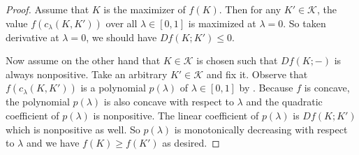 \begin{proof}
Assume that \(K\) is the maximizer of \(f(K)\). Then for any \(K' \in \mathcal{K}\), the value \(f(c_\lambda(K, K'))\) over all \(\lambda \in [0, 1]\) is maximized at \(\lambda = 0\). So taken derivative at \(\lambda = 0\), we should have \(Df(K; K') \leq 0\).

Now assume on the other hand that \(K \in \mathcal{K}\) is chosen such that \(Df(K; -)\) is always nonpositive. Take an arbitrary \(K' \in \mathcal{K}\) and fix it. Observe that \(f(c_\lambda(K, K'))\) is a polynomial \(p(\lambda)\) of \(\lambda \in [0, 1]\) by . Because \(f\) is concave, the polynomial \(p(\lambda)\) is also concave with respect to \(\lambda\) and the quadratic coefficient of \(p(\lambda)\) is nonpositive. The linear coefficient of \(p(\lambda)\) is \(Df(K; K')\) which is nonpositive as well. So \(p(\lambda)\) is monotonically decreasing with respect to \(\lambda\) and we have \(f(K) \geq f(K')\) as desired.
\end{proof}